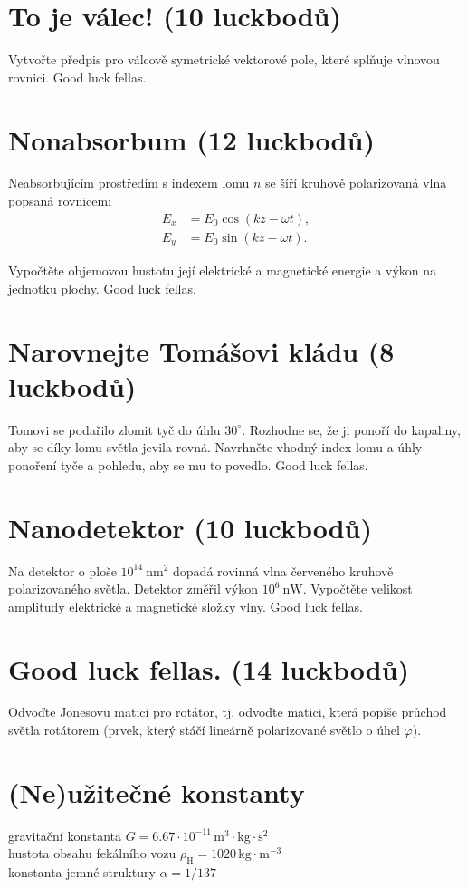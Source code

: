 \documentclass[11pt,a4paper,landscape]{article}
\begin{document}
\begin{multicols}{2}[]
\section{To je válec! (10 luckbodů)}
Vytvořte předpis pro válcově symetrické vektorové pole, které splňuje vlnovou rovnici. Good luck fellas.

\section{Nonabsorbum (12 luckbodů)}

Neabsorbujícím prostředím s indexem lomu $n$ se šíří kruhově polarizovaná vlna popsaná rovnicemi
\begin{subequations}
\begin{align}
E_x &= E_0\cos{\left(kz - \omega t\right)},\\
E_y &= E_0\sin{\left(kz - \omega t\right)}.
\end{align}
\end{subequations}

Vypočtěte objemovou hustotu její elektrické a magnetické energie a výkon na jednotku plochy. Good luck fellas.

\section{Narovnejte Tomášovi kládu (8 luckbodů)}
Tomovi se podařilo zlomit tyč do úhlu $30^{\circ}$. Rozhodne se, že ji ponoří do kapaliny, aby se díky lomu světla jevila rovná. Navrhněte vhodný index lomu a úhly ponoření tyče a pohledu, aby se mu to povedlo. Good luck fellas.

\section{Nanodetektor (10 luckbodů)}
 Na detektor o ploše $10^{14}~\mathrm{nm^2}$ dopadá rovinná vlna červeného kruhově polarizovaného světla. Detektor změřil výkon $10^6~\mathrm{nW}$. Vypočtěte velikost amplitudy elektrické a magnetické složky vlny. Good luck fellas.

\section{Good luck fellas. (14 luckbodů)}

Odvoďte Jonesovu matici pro rotátor, tj. odvoďte matici, která popíše průchod světla rotátorem (prvek, který stáčí lineárně polarizované světlo o úhel $\varphi$).

\section*{(Ne)užitečné konstanty}
gravitační konstanta $G = 6.67\cdot 10^{-11}\, \mathrm{m}^3\cdot\mathrm{kg}\cdot \mathrm{s}^2$\\
hustota obsahu fekálního vozu $\rho_{\mathrm{H}} = 1020\,\mathrm{kg}\cdot\mathrm{m}^{-3}$\\
konstanta jemné struktury $\alpha = 1/137$

\end{multicols}
\end{document}
